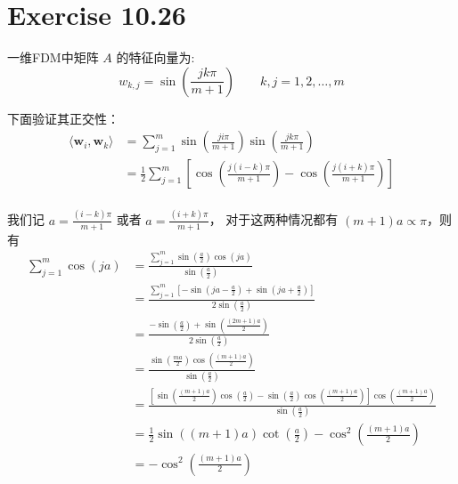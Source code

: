 \documentclass[a4paper]{article}
\begin{document}
\section*{Exercise 10.26}

\par 一维FDM中矩阵 $A$ 的特征向量为:
\begin{equation}
    w_{k,j} = \sin\left(\frac{jk\pi}{m+1}\right) \qquad k,j = 1,2,\ldots,m
\end{equation}
\par 下面验证其正交性：
\begin{equation}
    \begin{aligned}
        \langle \mathbf{w}_i, \mathbf{w}_k \rangle
        &= \sum_{j=1}^m \sin\left(\frac{ji\pi}{m+1}\right) \sin\left(\frac{jk\pi}{m+1}\right) \\
        &= \frac{1}{2}\sum_{j=1}^m \left[ \cos\left(\frac{j(i-k)\pi}{m+1}\right) - \cos\left(\frac{j(i+k)\pi}{m+1}\right) \right] \\
    \end{aligned}
\end{equation}
\par 我们记 $a = \frac{(i-k)\pi}{m+1}$ 或者 $a = \frac{(i+k)\pi}{m+1}$，
对于这两种情况都有 $(m+1)a\propto \pi$，则有
\begin{equation}
    \begin{aligned}
        \sum_{j=1}^m \cos (ja)
        &= \frac{\sum_{j=1}^m \sin\left(\frac{a}{2}\right)\cos (ja)}
        {\sin\left(\frac{a}{2}\right)} \\
        &= \frac{\sum_{j=1}^m \left[-\sin\left(ja-\frac{a}{2}\right)+\sin\left(ja+\frac{a}{2}\right)\right]}
        {2\sin\left(\frac{a}{2}\right)} \\
        &= \frac{-\sin\left(\frac{a}{2}\right)+\sin\left(\frac{(2m+1)a}{2}\right)}
        {2\sin\left(\frac{a}{2}\right)} \\
        &= \frac{\sin\left(\frac{ma}{2}\right)\cos\left(\frac{(m+1)a}{2}\right)}
        {\sin\left(\frac{a}{2}\right)} \\
        &= \frac{\left[
            \sin\left(\frac{(m+1)a}{2}\right)\cos\left(\frac{a}{2}\right)
            -\sin\left(\frac{a}{2}\right)\cos\left(\frac{(m+1)a}{2}\right)
        \right]\cos\left(\frac{(m+1)a}{2}\right)}
        {\sin\left(\frac{a}{2}\right)} \\
        &= \frac{1}{2}\sin\left((m+1)a\right)\cot\left(\frac{a}{2}\right)
        - \cos^2\left(\frac{(m+1)a}{2}\right) \\
        &= - \cos^2\left(\frac{(m+1)a}{2}\right)
    \end{aligned}
\end{equation}
\end{document}
